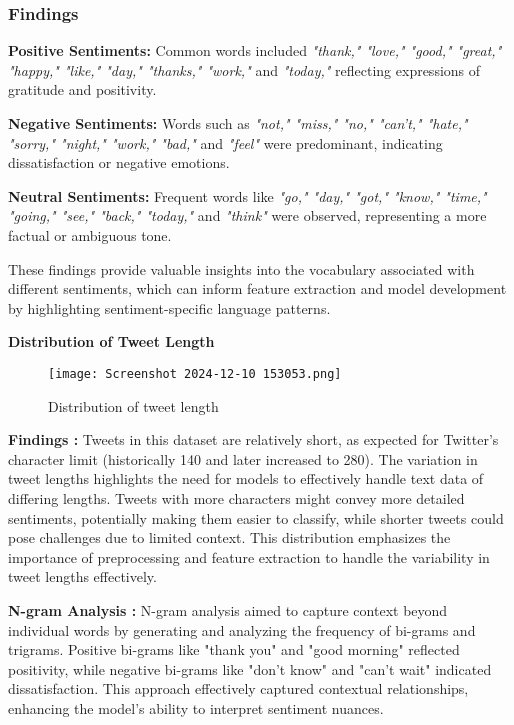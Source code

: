 \documentclass[journal]{IEEEtran}
\begin{document}
\subsubsection*{\textbf{Findings}}

\textbf{Positive Sentiments:} Common words included \textit{"thank," "love," "good," "great," "happy," "like," "day," "thanks," "work,"} and \textit{"today,"} reflecting expressions of gratitude and positivity.

\textbf{Negative Sentiments:} Words such as \textit{"not," "miss," "no," "can't," "hate," "sorry," "night," "work," "bad,"} and \textit{"feel"} were predominant, indicating dissatisfaction or negative emotions.

\textbf{Neutral Sentiments:} Frequent words like \textit{"go," "day," "got," "know," "time," "going," "see," "back," "today,"} and \textit{"think"} were observed, representing a more factual or ambiguous tone.

These findings provide valuable insights into the vocabulary associated with different sentiments, which can inform feature extraction and model development by highlighting sentiment-specific language patterns.


\textbf{Distribution of Tweet Length}

\begin{figure}[H]
\centering
\texttt{[image: Screenshot 2024-12-10 153053.png]}
\caption{Distribution of tweet length }
\end{figure}

\textbf{Findings : }
Tweets in this dataset are relatively short, as expected for Twitter's character limit (historically 140 and later increased to 280). The variation in tweet lengths highlights the need for models to effectively handle text data of differing lengths. Tweets with more characters might convey more detailed sentiments, potentially making them easier to classify, while shorter tweets could pose challenges due to limited context. This distribution emphasizes the importance of preprocessing and feature extraction to handle the variability in tweet lengths effectively.


\textbf{N-gram Analysis :} N-gram analysis aimed to capture context beyond individual words by generating and analyzing the frequency of bi-grams and trigrams. Positive bi-grams like "thank you" and "good morning" reflected positivity, while negative bi-grams like "don't know" and "can't wait" indicated dissatisfaction. This approach effectively captured contextual relationships, enhancing the model's ability to interpret sentiment nuances.
\end{document}
